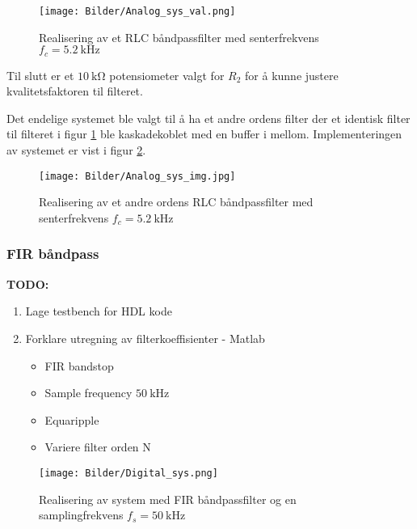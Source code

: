 \begin{figure}[H]
    \centering
    \texttt{[image: Bilder/Analog\_sys\_val.png]}
    \caption{Realisering av et RLC båndpassfilter med senterfrekvens $f_c = \SI{5.2}{\kilo\hertz}$}
    \label{fig:impl_rcl_sys}
\end{figure}

Til slutt er et $\SI{10}{\kilo\ohm}$ potensiometer valgt for $R_2$ for å kunne justere kvalitetsfaktoren
til filteret. 

Det endelige systemet ble valgt til å ha et andre ordens filter der et identisk filter til filteret i figur \ref{fig:impl_rcl_sys} ble 
kaskadekoblet med en buffer i mellom. Implementeringen av systemet er vist i figur \ref{fig:impl_rcl_sys_img}.

\begin{figure}[H]
    \centering
    \texttt{[image: Bilder/Analog\_sys\_img.jpg]}
    \caption{Realisering av et andre ordens RLC båndpassfilter med senterfrekvens $f_c = \SI{5.2}{\kilo\hertz}$}
    \label{fig:impl_rcl_sys_img}
\end{figure}

\subsubsection{FIR båndpass}
\begin{tcolorbox}[colback=white, colframe=white!55!black]
    \textbf{TODO:}
    \begin{enumerate}
        \item Lage testbench for HDL kode
        \item Forklare utregning av filterkoeffisienter - Matlab
            \begin{itemize}
                \item FIR bandstop 
                \item Sample frequency $\SI{50}{\kilo\hertz}$
                \item Equaripple
                \item Variere filter orden N
            \end{itemize}
    \end{enumerate}
\end{tcolorbox}

\begin{figure}[H]
    \centering
    \texttt{[image: Bilder/Digital\_sys.png]}
    \caption{Realisering av system med FIR båndpassfilter og en samplingfrekvens $f_s = \SI{50}{\kilo\hertz}$}
    \label{fig:fir_sys}
\end{figure}

